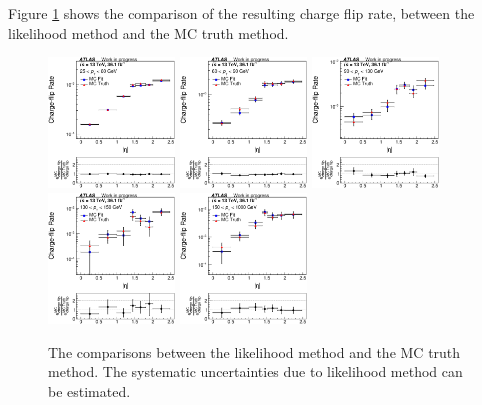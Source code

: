 Figure \ref{fig:charge_flip_sys_truth} shows the comparison of the resulting charge flip rate, between the likelihood method and the MC truth method.
\begin{figure}
\centering
\includegraphics[width=0.3\textwidth]{data/plot/charge_flip/FitPlots/mc_cf_rate_0.eps}
\includegraphics[width=0.3\textwidth]{data/plot/charge_flip/FitPlots/mc_cf_rate_1.eps}
\includegraphics[width=0.3\textwidth]{data/plot/charge_flip/FitPlots/mc_cf_rate_2.eps} \\
\includegraphics[width=0.3\textwidth]{data/plot/charge_flip/FitPlots/mc_cf_rate_3.eps}
\includegraphics[width=0.3\textwidth]{data/plot/charge_flip/FitPlots/mc_cf_rate_4.eps}
\caption{The comparisons between the likelihood method and the MC truth method. The systematic uncertainties due to likelihood method can be estimated.}
\label{fig:charge_flip_sys_truth}
\end{figure}

